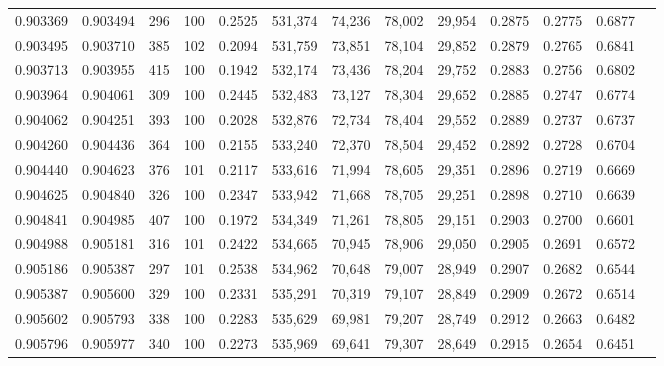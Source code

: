 \begin{tabular}{rrrrrrrrrrrrr}
0.903369 & 0.903494 &   296 & 100 &                                     0.2525 & 531,374 &  74,236 &  78,002 &  29,954 & 0.2875 & 0.2775 & 0.6877 \\
0.903495 & 0.903710 &   385 & 102 &                                     0.2094 & 531,759 &  73,851 &  78,104 &  29,852 & 0.2879 & 0.2765 & 0.6841 \\
0.903713 & 0.903955 &   415 & 100 &                                     0.1942 & 532,174 &  73,436 &  78,204 &  29,752 & 0.2883 & 0.2756 & 0.6802 \\
0.903964 & 0.904061 &   309 & 100 &                                     0.2445 & 532,483 &  73,127 &  78,304 &  29,652 & 0.2885 & 0.2747 & 0.6774 \\
0.904062 & 0.904251 &   393 & 100 &                                     0.2028 & 532,876 &  72,734 &  78,404 &  29,552 & 0.2889 & 0.2737 & 0.6737 \\
0.904260 & 0.904436 &   364 & 100 &                                     0.2155 & 533,240 &  72,370 &  78,504 &  29,452 & 0.2892 & 0.2728 & 0.6704 \\
0.904440 & 0.904623 &   376 & 101 &                                     0.2117 & 533,616 &  71,994 &  78,605 &  29,351 & 0.2896 & 0.2719 & 0.6669 \\
0.904625 & 0.904840 &   326 & 100 &                                     0.2347 & 533,942 &  71,668 &  78,705 &  29,251 & 0.2898 & 0.2710 & 0.6639 \\
0.904841 & 0.904985 &   407 & 100 &                                     0.1972 & 534,349 &  71,261 &  78,805 &  29,151 & 0.2903 & 0.2700 & 0.6601 \\
0.904988 & 0.905181 &   316 & 101 &                                     0.2422 & 534,665 &  70,945 &  78,906 &  29,050 & 0.2905 & 0.2691 & 0.6572 \\
0.905186 & 0.905387 &   297 & 101 &                                     0.2538 & 534,962 &  70,648 &  79,007 &  28,949 & 0.2907 & 0.2682 & 0.6544 \\
0.905387 & 0.905600 &   329 & 100 &                                     0.2331 & 535,291 &  70,319 &  79,107 &  28,849 & 0.2909 & 0.2672 & 0.6514 \\
0.905602 & 0.905793 &   338 & 100 &                                     0.2283 & 535,629 &  69,981 &  79,207 &  28,749 & 0.2912 & 0.2663 & 0.6482 \\
0.905796 & 0.905977 &   340 & 100 &                                     0.2273 & 535,969 &  69,641 &  79,307 &  28,649 & 0.2915 & 0.2654 & 0.6451 \\

\end{tabular}
